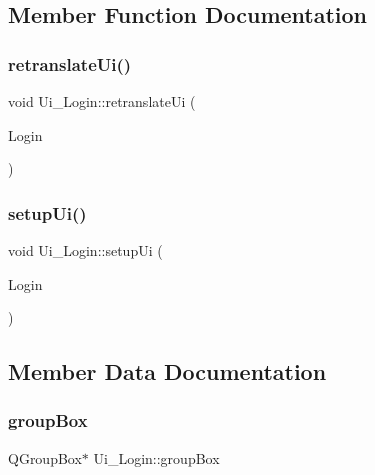 \subsection{Member Function Documentation}
\mbox{\label{class_ui___login_a049b51d8500e9cd762f272fabaeb7b12}} 
\subsubsection{\texorpdfstring{retranslate\+Ui()}{retranslateUi()}}
{\footnotesize\ttfamily void Ui\+\_\+\+Login\+::retranslate\+Ui (\begin{DoxyParamCaption}\item[{Q\+Dialog $\ast$}]{Login }\end{DoxyParamCaption})\hspace{0.3cm}{\ttfamily [inline]}}

\mbox{\label{class_ui___login_abf948ae577c8b92bed6c2ab9370042d1}} 
\subsubsection{\texorpdfstring{setup\+Ui()}{setupUi()}}
{\footnotesize\ttfamily void Ui\+\_\+\+Login\+::setup\+Ui (\begin{DoxyParamCaption}\item[{Q\+Dialog $\ast$}]{Login }\end{DoxyParamCaption})\hspace{0.3cm}{\ttfamily [inline]}}



\subsection{Member Data Documentation}
\mbox{\label{class_ui___login_a84554aaa2aa0a78ab0403ff8dc23aaaf}} 
\subsubsection{\texorpdfstring{group\+Box}{groupBox}}
{\footnotesize\ttfamily Q\+Group\+Box$\ast$ Ui\+\_\+\+Login\+::group\+Box}

